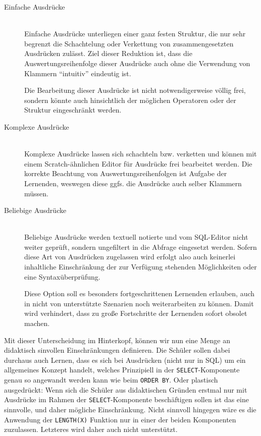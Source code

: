 \begin{description}
\item[Einfache Ausdrücke] \hfill\\
  Einfache Ausdrücke unterliegen einer ganz festen Struktur, die nur sehr begrenzt die Schachtelung oder Verkettung von zusammengesetzten Ausdrücken zulässt. Ziel dieser Reduktion ist, dass die Auswertungsreihenfolge dieser Ausdrücke auch ohne die Verwendung von Klammern ``intuitiv'' eindeutig ist.
  
  Die Bearbeitung dieser Ausdrücke ist nicht notwendigerweise völlig frei, sondern könnte auch hinsichtlich der möglichen Operatoren oder der Struktur eingeschränkt werden.
\item[Komplexe Ausdrücke] \hfill\\
  Komplexe Ausdrücke lassen sich schachteln bzw. verketten und können mit einem Scratch-ähnlichen Editor für Ausdrücke frei bearbeitet werden. Die korrekte Beachtung von Auswertungsreihenfolgen ist Aufgabe der Lernenden, weswegen diese ggfs. die Ausdrücke auch selber Klammern müssen.

\item[Beliebige Ausdrücke] \hfill\\
  Beliebige Ausdrücke werden textuell notierte und vom SQL-Editor nicht weiter geprüft, sondern ungefiltert in die Abfrage eingesetzt werden. Sofern diese Art von Ausdrücken zugelassen wird erfolgt also auch keinerlei inhaltliche Einschränkung der zur Verfügung stehenden Möglichkeiten oder eine Syntaxüberprüfung.

  Diese Option soll es besonders fortgeschrittenen Lernenden erlauben, auch in nicht von \idename unterstützte Szenarien noch weiterarbeiten zu können. Damit wird verhindert, dass zu große Fortschritte der Lernenden \idename sofort obsolet machen.
\end{description}

Mit dieser Unterscheidung im Hinterkopf, können wir nun eine Menge an didaktisch sinvollen Einschränkungen definieren. Die Schüler sollen dabei durchaus auch Lernen, dass es sich bei Ausdrücken (nicht nur in SQL) um ein allgemeines Konzept handelt, welches Prinzipiell in der \texttt{SELECT}-Komponente genau so angewandt werden kann wie beim \texttt{ORDER BY}. Oder plastisch ausgedrückt: Wenn sich die Schüler aus didaktischen Gründen erstmal nur mit Ausdrücke im Rahmen der \texttt{SELECT}-Komponente beschäftigen sollen ist das eine sinnvolle, und daher mögliche Einschränkung. Nicht sinnvoll hingegen wäre es die Anwendung der \texttt{LENGTH(X)} Funktion nur in einer der beiden Komponenten zuzulassen. Letzteres wird daher auch nicht unterstützt.

